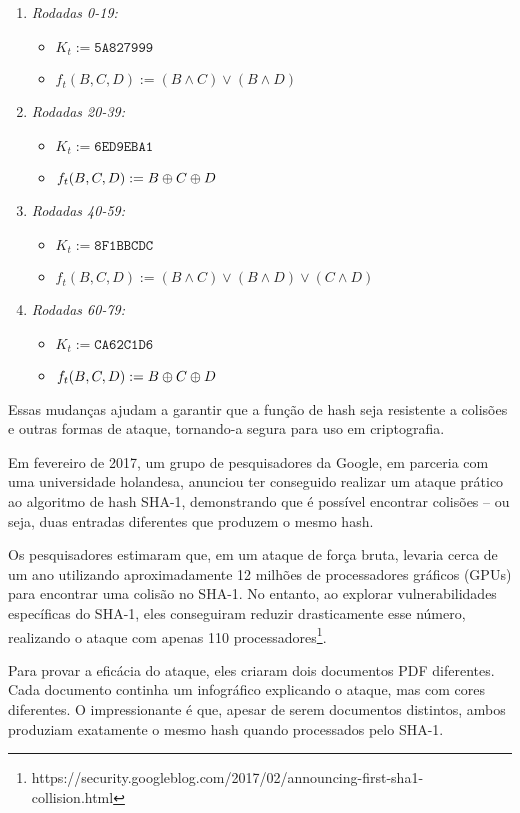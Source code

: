 \begin{enumerate}
\item {\em Rodadas 0-19:}
  \begin{itemize}
  \item[] $K_t := \texttt{5A827999}$
  \item[] $f_t(B,C,D) := (B \land C) \lor (B \land D)$
  \end{itemize}
\item {\em Rodadas 20-39:}
  \begin{itemize}
  \item[] $K_t := \texttt{6ED9EBA1}$
  \item[] $f_t(B,C,D) := B \oplus C \oplus D$
  \end{itemize}
\item {\em Rodadas 40-59:}
  \begin{itemize}
  \item[] $K_t := \texttt{8F1BBCDC}$
  \item[] $f_t(B,C,D) := (B \land C) \lor (B \land D) \lor (C \land D)$
  \end{itemize}
\item {\em Rodadas 60-79:}
  \begin{itemize}
  \item[] $K_t := \texttt{CA62C1D6}$
  \item[] $f_t(B,C,D) := B \oplus C \oplus D$
  \end{itemize}
\end{enumerate}

Essas mudanças ajudam a garantir que a função de hash seja resistente a colisões e outras formas de ataque, tornando-a segura para uso em criptografia.

Em fevereiro de 2017, um grupo de pesquisadores da Google, em parceria com uma universidade holandesa, anunciou ter conseguido realizar um ataque prático ao algoritmo de hash SHA-1, demonstrando que é possível encontrar colisões -- ou seja, duas entradas diferentes que produzem o mesmo hash.

Os pesquisadores estimaram que, em um ataque de força bruta, levaria cerca de um ano utilizando aproximadamente 12 milhões de processadores gráficos (GPUs) para encontrar uma colisão no SHA-1.
No entanto, ao explorar vulnerabilidades específicas do SHA-1, eles conseguiram reduzir drasticamente esse número, realizando o ataque com apenas 110 processadores\footnote{https://security.googleblog.com/2017/02/announcing-first-sha1-collision.html}.

Para provar a eficácia do ataque, eles criaram dois documentos PDF diferentes.
Cada documento continha um infográfico explicando o ataque, mas com cores diferentes.
O impressionante é que, apesar de serem documentos distintos, ambos produziam exatamente o mesmo hash quando processados pelo SHA-1.

